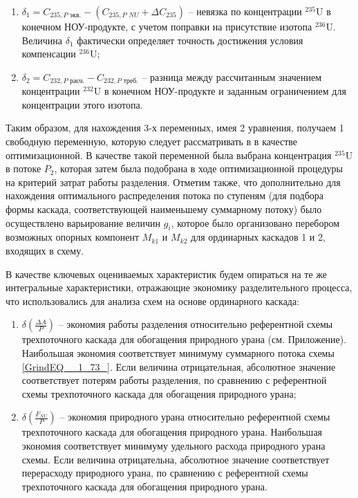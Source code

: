 \begin{enumerate}
    \item $\delta_{1}=C_{235,P\textit{ экв.}}-(C_{235,P\textit{ NU}}+\Delta C_{235})$ -- невязка по концентрации $^{235}$U в конечном НОУ-продукте, с учетом поправки на присутствие изотопа $^{236}$U. Величина $\delta_{1}$ фактически определяет точность достижения условия компенсации $^{236}$U;
    \item $\delta_{2}=C_{232,P\textit{ расч.}}-C_{232,P\textit{ треб.}}$ -- разница между рассчитанным значением концентрации $^{232}$U в конечном НОУ-продукте и заданным ограничением для концентрации этого изотопа.
\end{enumerate}

Таким образом, для нахождения 3-х переменных, имея 2 уравнения, получаем 1 свободную переменную, которую следует рассматривать в в качестве оптимизационной. В качестве такой переменной была выбрана концентрация $^{235}$U в потоке $P_{2}$, которая затем была подобрана в ходе оптимизационной процедуры на критерий затрат работы разделения. Отметим также, что дополнительно для нахождения оптимального распределения потока по ступеням (для подбора формы каскада, соответствующей наименьшему суммарному потоку) было осуществлено варьирование величин $g_{i}$, которое было организовано перебором возможных опорных компонент $M_{k1}$ и $M_{k2}$ для ординарных каскадов 1 и 2, входящих в схему.


В качестве ключевых оцениваемых характеристик будем опираться на те же интегральные характеристики, отражающие экономику разделительного процесса, что использовались для анализа схем на основе ординарного каскада:
\begin{enumerate}
    \item $\delta(\frac{\Delta A}{P})$ -- экономия работы разделения относительно референтной схемы трехпоточного каскада для обогащения природного урана (см. Приложение). Наибольшая экономия соответствует минимуму суммарного потока схемы \ref{GrindEQ__1_73_}. Если величина отрицательная, абсолютное значение соответствует потерям работы разделения, по сравнению с референтной схемы трехпоточного каскада для обогащения природного урана;
    \item $\delta(\frac{F_{NU}}{P})$ -- экономия природного урана относительно референтной схемы трехпоточного каскада для обогащения природного урана.  Наибольшая экономия соответствует минимуму удельного расхода природного урана схемы. Если величина отрицательна, абсолютное значение соответствует перерасходу природного урана, по сравнению с референтной схемы трехпоточного каскада для обогащения природного урана.
\end{enumerate}

